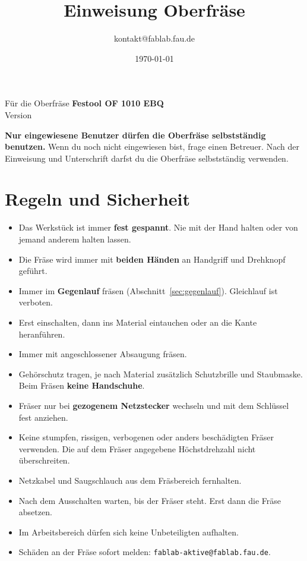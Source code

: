\documentclass{\basedir/fablab-document}
\date{\today}
\author{kontakt@fablab.fau.de}
\title{Einweisung Oberfräse}
\begin{document}
	\maketitle
	\begin{center}
		Für die Oberfräse \textbf{Festool OF 1010 EBQ}\\[1mm]
		{\small Version \Version}
	\end{center}

	\textbf{Nur eingewiesene Benutzer dürfen die Oberfräse selbstständig benutzen.}
	Wenn du noch nicht eingewiesen bist, frage einen Betreuer. Nach der Einweisung und Unterschrift darfst du die Oberfräse selbstständig verwenden.

	\section{Regeln und Sicherheit}

	\begin{itemize}
		\item Das Werkstück ist immer \textbf{fest gespannt}. Nie mit der Hand halten oder von jemand anderem halten lassen.
		\item Die Fräse wird immer mit \textbf{beiden Händen} an Handgriff und Drehknopf geführt.
		\item Immer im \textbf{Gegenlauf} fräsen (Abschnitt~\ref{sec:gegenlauf}). Gleichlauf ist verboten.
		\item Erst einschalten, dann ins Material eintauchen oder an die Kante heranführen.
		\item Immer mit angeschlossener Absaugung fräsen.
		\item Gehörschutz tragen, je nach Material zusätzlich Schutzbrille und Staubmaske. Beim Fräsen \textbf{keine Handschuhe}.
		\item Fräser nur bei \textbf{gezogenem Netzstecker} wechseln und mit dem Schlüssel fest anziehen.
		\item Keine stumpfen, rissigen, verbogenen oder anders beschädigten Fräser verwenden. Die auf dem Fräser angegebene Höchstdrehzahl nicht überschreiten.
		\item Netzkabel und Saugschlauch aus dem Fräsbereich fernhalten.
		\item Nach dem Ausschalten warten, bis der Fräser steht. Erst dann die Fräse absetzen.
		\item Im Arbeitsbereich dürfen sich keine Unbeteiligten aufhalten.
		\item Schäden an der Fräse sofort melden: \texttt{fablab-aktive@fablab.fau.de}.
	\end{itemize}
\end{document}
